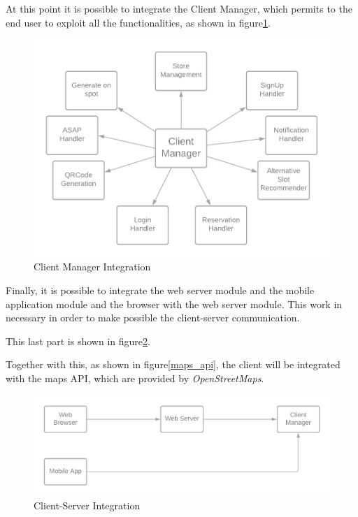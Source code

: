 \documentclass[table, 12pt]{article}
\begin{document}
At this point it is possible to integrate the Client Manager, which permits to the end user to exploit all the functionalities, as shown in figure\ref{client_manager}.

\begin{center}
    \begin{figure}[H]
        \includegraphics[width=\textwidth]{assets/IT-Plan/ClientManager.png}
        \caption{Client Manager Integration}\label{client_manager}
    \end{figure}
\end{center}

Finally, it is possible to integrate the web server module and the mobile application module and the browser with the web server module. This work in necessary in order to make possible the client-server communication.

This last part is shown in figure\ref{client_server_integration}.

Together with this, as shown in figure\ref{maps_api}, the client will be integrated with the maps API, which are provided by \textit{OpenStreetMaps}.

\begin{center}
    \begin{figure}[H]
        \includegraphics[width=\textwidth]{assets/IT-Plan/ClientServerIntegration.png}
        \caption{Client-Server Integration}\label{client_server_integration}
    \end{figure}
\end{center}
\end{document}
